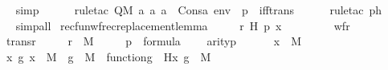 \begin{isabellebody}
\ \ \ \ \isamarkupfalse%
\ simp\isanewline
\ \ \ \ \isamarkupfalse%
\ {\isacharparenleft}{\kern0pt}rule{\isacharunderscore}{\kern0pt}tac\ Q{\isacharequal}{\kern0pt}{\isachardoublequoteopen}M{\isacharcomma}{\kern0pt}\ {\isacharbrackleft}{\kern0pt}a{}{\isacharcomma}{\kern0pt}\ a{}{\isacharcomma}{\kern0pt}\ a{}{\isacharbrackright}{\kern0pt}\ {\isacharat}{\kern0pt}\ Cons{\isacharparenleft}{\kern0pt}a{}{\isacharcomma}{\kern0pt}\ env{\isacharparenright}{\kern0pt}\ {\isasymTurnstile}\ p{\isachardoublequoteclose}\ \ iff{\isacharunderscore}{\kern0pt}trans{\isacharparenright}{\kern0pt}\isanewline
\ \ \ \ \isamarkupfalse%
\ {\isacharparenleft}{\kern0pt}rule{\isacharunderscore}{\kern0pt}tac\ ph{\isacharparenright}{\kern0pt}\isanewline
\ \ \ \ \isamarkupfalse%
\ simp{\isacharunderscore}{\kern0pt}all\isanewline
{}\isamarkupfalse%
%
\endisatagproof
{\isafoldproof}%
%
\isadelimproof
\isanewline
%
\endisadelimproof
\isanewline
{}\isamarkupfalse%
\ recfun{\isacharunderscore}{\kern0pt}wfrec{\isacharunderscore}{\kern0pt}replacement{\isacharunderscore}{\kern0pt}lemma\ {\isacharcolon}{\kern0pt}\ \isanewline
\ \ \ r\ H\ p\ x\ \isanewline
\ \ \ \isanewline
\ \ \ \ {\isachardoublequoteopen}wf{\isacharparenleft}{\kern0pt}r{\isacharparenright}{\kern0pt}{\isachardoublequoteclose}\ \isanewline
\ \ \ \ {\isachardoublequoteopen}trans{\isacharparenleft}{\kern0pt}r{\isacharparenright}{\kern0pt}{\isachardoublequoteclose}\ \isanewline
\ \ \ \ {\isachardoublequoteopen}r\ {\isasymin}\ M{\isachardoublequoteclose}\ \isanewline
\ \ \ \ {\isachardoublequoteopen}p\ {\isasymin}\ formula{\isachardoublequoteclose}\isanewline
\ \ \ \ {\isachardoublequoteopen}arity{\isacharparenleft}{\kern0pt}p{\isacharparenright}{\kern0pt}\ {\isasymle}\ {}{\isachardoublequoteclose}\isanewline
\ \ \ \ {\isachardoublequoteopen}x\ {\isasymin}\ M{\isachardoublequoteclose}\ \isanewline
\ \ \ \ {\isachardoublequoteopen}{\isacharparenleft}{\kern0pt}{\isasymAnd}x\ g{\isachardot}{\kern0pt}\ x\ {\isasymin}\ M\ {\isasymLongrightarrow}\ g\ {\isasymin}\ M\ {\isasymLongrightarrow}\ function{\isacharparenleft}{\kern0pt}g{\isacharparenright}{\kern0pt}\ {\isasymLongrightarrow}\ H{\isacharparenleft}{\kern0pt}x{\isacharcomma}{\kern0pt}\ g{\isacharparenright}{\kern0pt}\ {\isasymin}\ M{\isacharparenright}{\kern0pt}{\isachardoublequoteclose}\ \isanewline

\end{isabellebody}
